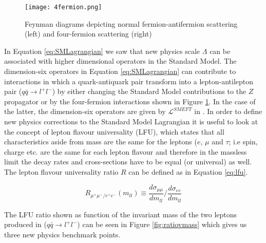 \documentclass[11pt,oneside,a4paper]{article}
\begin{document}
\begin{figure}[htbp]
	\centering
	\texttt{[image: 4fermion.png]}
	\caption{Feynman diagrams depicting normal fermion-antifermion scattering (left) and four-fermion scattering (right)}
	\label{fig:4fermion}
\end{figure}

In Equation \ref{eq:SMLagrangian} we saw that new physics scale $\Lambda$ can be associated with higher dimensional operators in the Standard Model. The dimension-six operators in Equation \ref{eq:SMLagrangian} can contribute to interactions in which a quark-antiquark pair transform into a lepton-antilepton pair ($q \bar{q} \rightarrow l^{+} l^{-}$) by either changing the Standard Model contributions to the $Z$ propagator or by the four-fermion interactions shown in Figure \ref{fig:4fermion}. In the case of the latter, the dimension-six operators are given by $\mathcal{L}^{SMEFT}$ in \cite{highptdilepton}. In order to define new physics corrections to the Standard Model Lagrangian it is useful to look at the concept of lepton flavour universality (LFU), which states that all characteristics aside from mass are the same for the leptons ($e$, $\mu$ and $\tau$; i.e spin, charge etc. are the same for each lepton flavour and therefore in the massless limit the decay rates and cross-sections have to be equal (or universal) as well.  The lepton flavour universality ratio $R$ can be defined as in Equation \ref{eq:lfu}.

\begin{equation}
\label{eq:lfu}
R_{\mu^{+}\mu^{-}/e^{+}e^{-}}(m_{ll}) \equiv \frac{d\sigma_{\mu\mu}}{dm_{ll}}/\frac{d\sigma_{ee}}{dm_{ll}}
\end{equation}

The LFU ratio shown as function of the invariant mass of the two leptons produced in ($q \bar{q} \rightarrow l^{+} l^{-}$) can be seen in Figure \ref{fig:ratiovmass} which gives us three new physics benchmark points.
\end{document}

